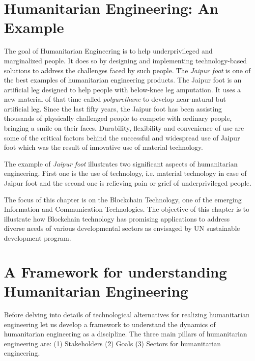 \documentclass[10pt]{IETBook}
\begin{document}
\section{Humanitarian Engineering: An Example}

The goal of Humanitarian Engineering is to help underprivileged and marginalized people.  
It does so by designing and implementing technology-based solutions to address the challenges faced by such people. The {\em Jaipur foot} \cite{arya2008jaipur} is one of the best examples of humanitarian engineering products. The Jaipur foot is an artificial leg designed to help people with below-knee leg amputation. It uses a new material of that time called {\em polyurethane} to develop near-natural but artificial leg. Since the last fifty years, the Jaipur foot has been assisting thousands of physically challenged people to compete with ordinary people, bringing a smile on their faces. Durability, flexibility and convenience of use are some of the critical factors behind the successful and widespread use of Jaipur foot which was the result of innovative use of material technology.

The example of {\em Jaipur foot} illustrates two significant aspects of humanitarian engineering. First one is the use of technology, i.e. material technology in case of Jaipur foot and the second one is relieving pain or grief of underprivileged people.

The focus of this chapter is on the Blockchain Technology, one of the emerging Information and Communication 
Technologies. The objective of this chapter is to illustrate how Blockchain technology has promising applications to address diverse needs of various developmental sectors as envisaged by UN sustainable development program. 

\section{A Framework for understanding Humanitarian Engineering}
Before delving into details of technological alternatives for realizing humanitarian engineering let us develop a framework to understand the dynamics of humanitarian engineering as a discipline. The three main pillars of humanitarian engineering are: (1) Stakeholders (2) 
Goals (3) Sectors for humanitarian engineering.
\end{document}
